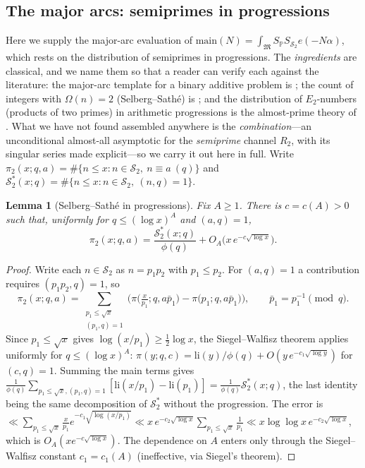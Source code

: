 \documentclass[]{interact}%
\newtheorem{lemma}{Lemma}
\newcommand{\PP}{\mathbb P}
\newcommand{\SSemi}{\mathcal S_2}
\newcommand{\OmegaF}{\Omega}
\begin{document}
\subsection{The major arcs: semiprimes in progressions}
\label{sec:majorarc}

Here we supply the major-arc evaluation of
$\mathrm{main}(N)=\int_{\mathfrak M}S_\PP S_{\SSemi}e(-N\alpha)$, which rests on the distribution
of semiprimes in progressions. The \emph{ingredients} are classical, and we name them so that a
reader can verify each against the literature: the major-arc template for a binary additive
problem is \citet[Ch.~3]{vaughan1997}; the count of integers with $\OmegaF(n)=2$
(Selberg--Sath\'e) is \citet[\S II.6]{tenenbaum}; and the distribution of $E_2$-numbers (products
of two primes) in arithmetic progressions is the almost-prime theory of \citet{halberstamrichert}.
What we have not found assembled anywhere is the \emph{combination}---an unconditional almost-all
asymptotic for the \emph{semiprime} channel $R_2$, with its singular series made explicit---so we
carry it out here in full. Write $\pi_2(x;q,a)=\#\{n\le x:n\in\SSemi,\ n\equiv a\ (q)\}$ and
$\SSemi^*(x;q)=\#\{n\le x:n\in\SSemi,\ (n,q)=1\}$.

\begin{lemma}[Selberg--Sath\'e in progressions]\label{lem:s2ap}
Fix $A\ge1$. There is $c=c(A)>0$ such that, uniformly for $q\le(\log x)^A$ and
$(a,q)=1$,
\[
  \pi_2(x;q,a)=\frac{\SSemi^*(x;q)}{\phi(q)}+O_A\!\big(x\,e^{-c\sqrt{\log x}}\big).
\]
\end{lemma}

\begin{proof}
Write each $n\in\SSemi$ as $n=p_1p_2$ with $p_1\le p_2$. For $(a,q)=1$ a contribution
requires $(p_1p_2,q)=1$, so
\[
  \pi_2(x;q,a)=\sum_{\substack{p_1\le\sqrt x\\(p_1,q)=1}}
  \Big(\pi\big(\tfrac{x}{p_1};q,a\bar p_1\big)-\pi\big(p_1;q,a\bar p_1\big)\Big),
  \qquad \bar p_1=p_1^{-1}\!\!\pmod q .
\]
Since $p_1\le\sqrt x$ gives $\log(x/p_1)\ge\tfrac12\log x$, the Siegel--Walfisz theorem
applies uniformly for $q\le(\log x)^A$:
$\pi(y;q,c)=\mathrm{li}(y)/\phi(q)+O(y\,e^{-c_1\sqrt{\log y}})$ for $(c,q)=1$. Summing the
main terms gives $\frac1{\phi(q)}\sum_{p_1\le\sqrt x,(p_1,q)=1}[\mathrm{li}(x/p_1)-\mathrm{li}(p_1)]
=\frac1{\phi(q)}\SSemi^*(x;q)$, the last identity being the same decomposition of
$\SSemi^*$ without the progression. The error is
$\ll\sum_{p_1\le\sqrt x}\tfrac{x}{p_1}e^{-c_1\sqrt{\log(x/p_1)}}
\ll x\,e^{-c_2\sqrt{\log x}}\sum_{p_1\le\sqrt x}\tfrac1{p_1}\ll x\log\log x\,e^{-c_2\sqrt{\log x}}$,
which is $O_A(x e^{-c\sqrt{\log x}})$. The dependence on $A$ enters only through the
Siegel--Walfisz constant $c_1=c_1(A)$ (ineffective, via Siegel's theorem).
\end{proof}
\end{document}
